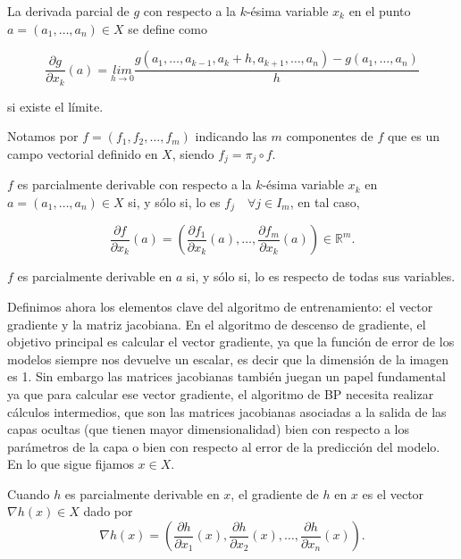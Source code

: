 \begin{definicion}
           

	La derivada parcial de $g$ con respecto a la $k$-ésima variable $x_k$ en el punto $a = (a_1, \ldots, a_n)\in X$ se define como

	$$ \frac{\partial g}{\partial x_k}(a) = \underset{h\rightarrow0}{lim}\frac{g(a_1, \ldots, a_{k-1}, a_k + h, a_{k+1}, \ldots, a_n) - g(a_1, \ldots, a_n)}{h}$$

	si existe el límite.
\end{definicion}

Notamos por $f= \left ( f_1,f_2,\ldots, f_m \right )$ indicando las $m$ componentes de $f$ que es un campo vectorial definido en $X$, siendo $f_j=\pi _j \circ f$. 


\begin{definicion}
        $f$ es parcialmente derivable con respecto a la $k$-ésima variable $x_k$ en $a = (a_1, \ldots, a_n)\in X$ si, y sólo si, lo es $f_j \quad \forall j \in I_m$, en tal caso, 

        $$\frac{\partial f}{\partial x_k}(a) = \left ( \frac{\partial f_1}{\partial x_k}(a), \ldots, \frac{\partial f_m}{\partial x_k}(a) \right ) \in \mathbb{R}^m.$$

        $f$ es parcialmente derivable en $a$ si, y sólo si, lo es respecto de todas sus variables.
\end{definicion}


Definimos ahora los elementos clave del algoritmo de entrenamiento: el vector gradiente y la matriz jacobiana. En el algoritmo de descenso de gradiente, el objetivo principal es calcular el vector gradiente, ya que la función de error de los modelos siempre nos devuelve un escalar, es decir que la dimensión de la imagen es 1. Sin embargo las matrices jacobianas también juegan un papel fundamental ya que para calcular ese vector gradiente, el algoritmo de BP necesita realizar cálculos intermedios, que son las matrices jacobianas asociadas a la salida de las capas ocultas (que tienen mayor dimensionalidad) bien con respecto a los parámetros de la capa o bien con respecto al error de la predicción del modelo. En lo que sigue fijamos $x \in X$.

\begin{definicion}
    Cuando $h$ es parcialmente derivable en $x$, el gradiente de $h$ en $x$ es el vector $\nabla h(x) \in X$ dado por 
    $$\nabla h(x) = \left ( \frac{\partial h}{\partial x_1}(x), \frac{\partial h}{\partial x_2}(x), \ldots, \frac{\partial h}{\partial x_n}(x) \right ).$$
\end{definicion}


